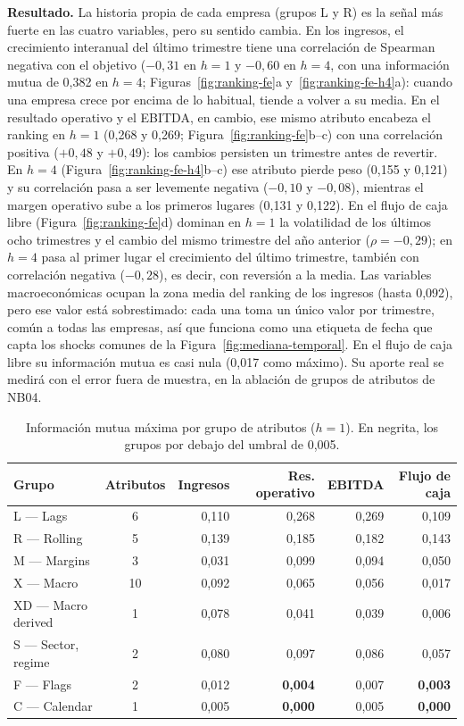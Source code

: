 \documentclass[12pt,letterpaper,oneside]{report}
\renewcommand{\_}{\UnderscoreOriginal\allowbreak}
\begin{document}
\textbf{Resultado.} La historia propia de cada empresa (grupos L y R) es la señal más fuerte en las cuatro variables, pero su sentido cambia. En los ingresos, el crecimiento interanual del último trimestre tiene una correlación de Spearman negativa con el objetivo ($-0{,}31$ en $h = 1$ y $-0{,}60$ en $h = 4$, con una información mutua de 0,382 en $h = 4$; Figuras~\ref{fig:ranking-fe}a y~\ref{fig:ranking-fe-h4}a): cuando una empresa crece por encima de lo habitual, tiende a volver a su media. En el resultado operativo y el EBITDA, en cambio, ese mismo atributo encabeza el ranking en $h = 1$ (0,268 y 0,269; Figura~\ref{fig:ranking-fe}b--c) con una correlación positiva ($+0{,}48$ y $+0{,}49$): los cambios persisten un trimestre antes de revertir. En $h = 4$ (Figura~\ref{fig:ranking-fe-h4}b--c) ese atributo pierde peso (0,155 y 0,121) y su correlación pasa a ser levemente negativa ($-0{,}10$ y $-0{,}08$), mientras el margen operativo sube a los primeros lugares (0,131 y 0,122). En el flujo de caja libre (Figura~\ref{fig:ranking-fe}d) dominan en $h = 1$ la volatilidad de los últimos ocho trimestres y el cambio del mismo trimestre del año anterior ($\rho = -0{,}29$); en $h = 4$ pasa al primer lugar el crecimiento del último trimestre, también con correlación negativa ($-0{,}28$), es decir, con reversión a la media. Las variables macroeconómicas ocupan la zona media del ranking de los ingresos (hasta 0,092), pero ese valor está sobrestimado: cada una toma un único valor por trimestre, común a todas las empresas, así que funciona como una etiqueta de fecha que capta los shocks comunes de la Figura~\ref{fig:mediana-temporal}. En el flujo de caja libre su información mutua es casi nula (0,017 como máximo). Su aporte real se medirá con el error fuera de muestra, en la ablación de grupos de atributos de NB04.

\begin{table}[H]
\centering
\caption{Información mutua máxima por grupo de atributos ($h = 1$). En negrita, los grupos por debajo del umbral de 0,005.}
\label{tab:grupos-res}
\begin{tabular}{@{}lcrrrr@{}}
\toprule
Grupo & Atributos & Ingresos & Res. operativo & EBITDA & Flujo de caja \\
\midrule
L --- Lags                 & 6  & 0,110 & 0,268 & 0,269 & 0,109 \\
R --- Rolling              & 5  & 0,139 & 0,185 & 0,182 & 0,143 \\
M --- Margins              & 3  & 0,031 & 0,099 & 0,094 & 0,050 \\
X --- Macro                & 10 & 0,092 & 0,065 & 0,056 & 0,017 \\
XD --- Macro derived       & 1  & 0,078 & 0,041 & 0,039 & 0,006 \\
S --- Sector, regime       & 2  & 0,080 & 0,097 & 0,086 & 0,057 \\
F --- Flags                & 2  & 0,012 & \textbf{0,004} & 0,007 & \textbf{0,003} \\
C --- Calendar             & 1  & 0,005 & \textbf{0,000} & 0,005 & \textbf{0,000} \\
\bottomrule
\end{tabular}
\end{table}
\end{document}
